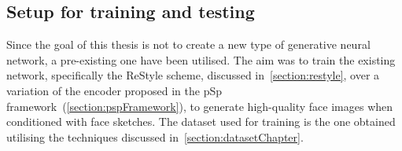 \subsection{Setup for training and testing} %
\label{sec:training and testing setup}
Since the goal of this thesis is not to create a new type of generative neural network, a pre-existing one have been utilised. The aim was to train the existing network, specifically the ReStyle scheme, discussed in~\ref{section:restyle}, over a variation of the encoder proposed in the pSp framework~(\ref{section:pspFramework}), to generate high-quality face images when conditioned with face sketches. 
The dataset used for training is the one obtained utilising the techniques discussed in~\ref{section:datasetChapter}.
%
